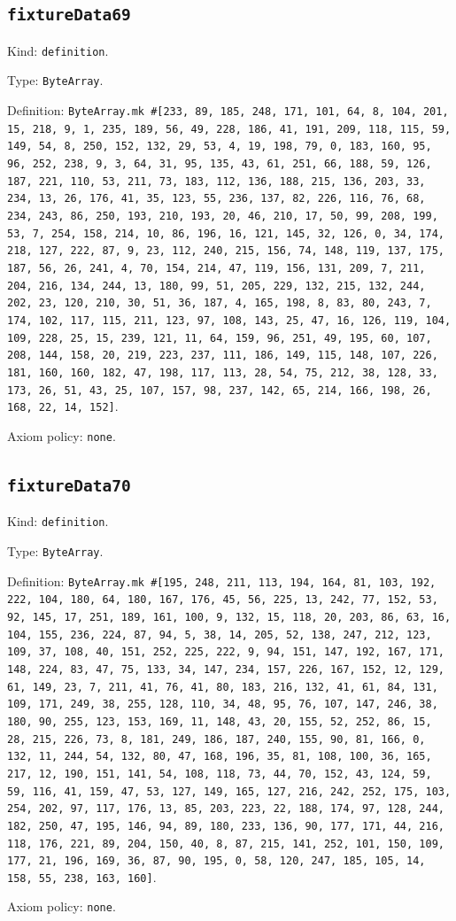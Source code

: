 \documentclass[11pt]{article}
\begin{document}
\subsection*{\texttt{fixtureData69}}
\noindent Kind: \texttt{definition}.\par
\noindent Type: \texttt{ByteArray}.\par
\noindent Definition: \texttt{ByteArray.mk \#[233, 89, 185, 248, 171, 101, 64, 8, 104, 201, 15, 218, 9, 1, 235, 189, 56, 49, 228, 186, 41, 191, 209, 118, 115, 59, 149, 54, 8, 250, 152, 132, 29, 53, 4, 19, 198, 79, 0, 183, 160, 95, 96, 252, 238, 9, 3, 64, 31, 95, 135, 43, 61, 251, 66, 188, 59, 126, 187, 221, 110, 53, 211, 73, 183, 112, 136, 188, 215, 136, 203, 33, 234, 13, 26, 176, 41, 35, 123, 55, 236, 137, 82, 226, 116, 76, 68, 234, 243, 86, 250, 193, 210, 193, 20, 46, 210, 17, 50, 99, 208, 199, 53, 7, 254, 158, 214, 10, 86, 196, 16, 121, 145, 32, 126, 0, 34, 174, 218, 127, 222, 87, 9, 23, 112, 240, 215, 156, 74, 148, 119, 137, 175, 187, 56, 26, 241, 4, 70, 154, 214, 47, 119, 156, 131, 209, 7, 211, 204, 216, 134, 244, 13, 180, 99, 51, 205, 229, 132, 215, 132, 244, 202, 23, 120, 210, 30, 51, 36, 187, 4, 165, 198, 8, 83, 80, 243, 7, 174, 102, 117, 115, 211, 123, 97, 108, 143, 25, 47, 16, 126, 119, 104, 109, 228, 25, 15, 239, 121, 11, 64, 159, 96, 251, 49, 195, 60, 107, 208, 144, 158, 20, 219, 223, 237, 111, 186, 149, 115, 148, 107, 226, 181, 160, 160, 182, 47, 198, 117, 113, 28, 54, 75, 212, 38, 128, 33, 173, 26, 51, 43, 25, 107, 157, 98, 237, 142, 65, 214, 166, 198, 26, 168, 22, 14, 152]}.\par
\noindent Axiom policy: \texttt{none}.\par
\subsection*{\texttt{fixtureData70}}
\noindent Kind: \texttt{definition}.\par
\noindent Type: \texttt{ByteArray}.\par
\noindent Definition: \texttt{ByteArray.mk \#[195, 248, 211, 113, 194, 164, 81, 103, 192, 222, 104, 180, 64, 180, 167, 176, 45, 56, 225, 13, 242, 77, 152, 53, 92, 145, 17, 251, 189, 161, 100, 9, 132, 15, 118, 20, 203, 86, 63, 16, 104, 155, 236, 224, 87, 94, 5, 38, 14, 205, 52, 138, 247, 212, 123, 109, 37, 108, 40, 151, 252, 225, 222, 9, 94, 151, 147, 192, 167, 171, 148, 224, 83, 47, 75, 133, 34, 147, 234, 157, 226, 167, 152, 12, 129, 61, 149, 23, 7, 211, 41, 76, 41, 80, 183, 216, 132, 41, 61, 84, 131, 109, 171, 249, 38, 255, 128, 110, 34, 48, 95, 76, 107, 147, 246, 38, 180, 90, 255, 123, 153, 169, 11, 148, 43, 20, 155, 52, 252, 86, 15, 28, 215, 226, 73, 8, 181, 249, 186, 187, 240, 155, 90, 81, 166, 0, 132, 11, 244, 54, 132, 80, 47, 168, 196, 35, 81, 108, 100, 36, 165, 217, 12, 190, 151, 141, 54, 108, 118, 73, 44, 70, 152, 43, 124, 59, 59, 116, 41, 159, 47, 53, 127, 149, 165, 127, 216, 242, 252, 175, 103, 254, 202, 97, 117, 176, 13, 85, 203, 223, 22, 188, 174, 97, 128, 244, 182, 250, 47, 195, 146, 94, 89, 180, 233, 136, 90, 177, 171, 44, 216, 118, 176, 221, 89, 204, 150, 40, 8, 87, 215, 141, 252, 101, 150, 109, 177, 21, 196, 169, 36, 87, 90, 195, 0, 58, 120, 247, 185, 105, 14, 158, 55, 238, 163, 160]}.\par
\noindent Axiom policy: \texttt{none}.\par
\end{document}
